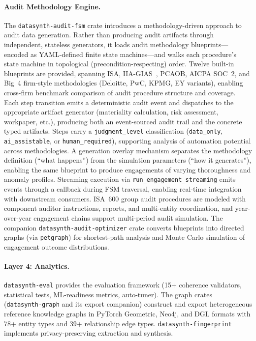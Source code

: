 \paragraph{Audit Methodology Engine.}
The \texttt{datasynth-audit-fsm} crate introduces a methodology-driven
approach to audit data generation.  Rather than producing audit artifacts
through independent, stateless generators, it loads audit methodology
blueprints---encoded as YAML-defined finite state machines---and walks
each procedure's state machine in topological (precondition-respecting)
order.  Twelve built-in blueprints are provided, spanning ISA,
IIA-GIAS~\citep{iia2024gias}, PCAOB, AICPA SOC~2, and Big~4 firm-style
methodologies (Deloitte, PwC, KPMG, EY variants), enabling cross-firm
benchmark comparison of audit procedure structure and coverage.
Each step transition emits a deterministic audit event and dispatches to
the appropriate artifact generator (materiality calculation, risk
assessment, workpaper, etc.), producing both an event-sourced audit trail
and the concrete typed artifacts.  Steps carry a
\texttt{judgment\_level} classification (\texttt{data\_only},
\texttt{ai\_assistable}, or \texttt{human\_required}), supporting
analysis of automation potential across methodologies.
A generation overlay mechanism separates the methodology definition
(``what happens'') from the simulation parameters (``how it generates''),
enabling the same blueprint to produce engagements of varying
thoroughness and anomaly profiles.  Streaming execution via
\texttt{run\_engagement\_streaming} emits events through a callback
during FSM traversal, enabling real-time integration with downstream
consumers.  ISA~600 group audit procedures are modeled with component
auditor instructions, reports, and multi-entity coordination, and
year-over-year engagement chains support multi-period audit simulation.
The companion \texttt{datasynth-audit-optimizer} crate converts
blueprints into directed graphs (via \texttt{petgraph}) for
shortest-path analysis and Monte Carlo simulation of engagement outcome
distributions.

\paragraph{Layer 4: Analytics.}
\texttt{datasynth-eval} provides the evaluation framework (15+
coherence validators, statistical tests, ML-readiness metrics,
auto-tuner).
The graph crates (\texttt{datasynth-graph} and its export companion)
construct and export heterogeneous reference knowledge graphs in
PyTorch Geometric, Neo4j, and DGL formats with 78+ entity types and
39+ relationship edge types.
\texttt{datasynth-fingerprint} implements privacy-preserving extraction
and synthesis.

